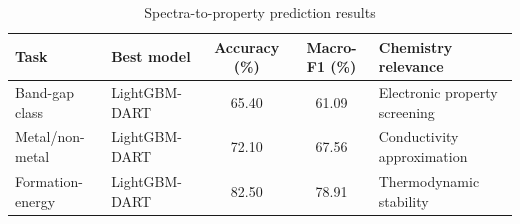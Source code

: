 \begin{table}[htbp]
\caption{Spectra-to-property prediction results}
\label{tab:property_results}
\centering
\begin{tabularx}{\textwidth}{l l c c X}
\toprule
\textbf{Task} & \textbf{Best model} & \textbf{Accuracy (\%)} & \textbf{Macro-F1 (\%)} & \textbf{Chemistry relevance} \\
\midrule
Band-gap class & LightGBM-DART & 65.40 & 61.09 & Electronic property screening \\
Metal/non-metal & LightGBM-DART & 72.10 & 67.56 & Conductivity approximation \\
Formation-energy & LightGBM-DART & 82.50 & 78.91 & Thermodynamic stability \\
\bottomrule
\end{tabularx}
\end{table}
